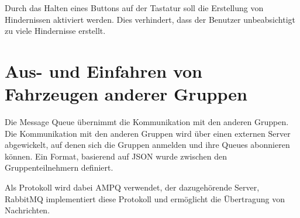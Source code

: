 Durch das Halten eines Buttons auf der Tastatur soll die Erstellung von Hindernissen aktiviert werden. Dies verhindert, dass der Benutzer unbeabsichtigt zu viele Hindernisse erstellt.

\section{Aus- und Einfahren von Fahrzeugen anderer Gruppen}

Die Message Queue übernimmt die Kommunikation mit den anderen Gruppen. Die Kommunikation mit den anderen Gruppen wird über einen externen Server abgewickelt, auf denen sich die Gruppen anmelden und ihre Queues abonnieren können. Ein Format, basierend auf JSON wurde zwischen den Gruppenteilnehmern definiert.

Als Protokoll wird dabei AMPQ verwendet, der dazugehörende Server, RabbitMQ implementiert diese Protokoll und ermöglicht die Übertragung von Nachrichten.